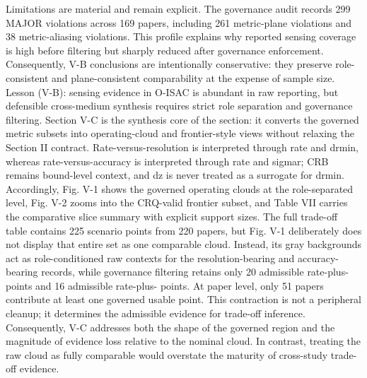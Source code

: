 {}Limitations are material and remain explicit. The governance audit records 299 MAJOR violations across 169 papers, including 261 metric-plane violations and 38 metric-aliasing violations. This profile explains why reported sensing coverage is high before filtering but sharply reduced after governance enforcement. Consequently, V-B conclusions are intentionally conservative: they preserve role-consistent and plane-consistent comparability at the expense of sample size.\markdownRendererParagraphSeparator
{}Lesson (V-B): sensing evidence in O-ISAC is abundant in raw reporting, but defensible cross-medium synthesis requires strict role separation and governance filtering.\markdownRendererInterblockSeparator
{}
\markdownRendererSectionEnd \markdownRendererSectionBegin
{}\markdownRendererInterblockSeparator
{}Section V-C is the synthesis core of the section: it converts the governed metric subsets into operating-cloud and frontier-style views without relaxing the Section II contract. Rate-versus-resolution is interpreted through rate and drmin, whereas rate-versus-accuracy is interpreted through rate and sigma\markdownRendererUnderscore{}r; CRB remains bound-level context, and dz is never treated as a surrogate for drmin. Accordingly, Fig. V-1 shows the governed operating clouds at the role-separated level, Fig. V-2 zooms into the CRQ-valid frontier subset, and Table VII carries the comparative slice summary with explicit support sizes.\markdownRendererParagraphSeparator
{}\markdownRendererParagraphSeparator
{}The full trade-off table contains 225 scenario points from 220 papers, but Fig. V-1 deliberately does not display that entire set as one comparable cloud. Instead, its gray backgrounds act as role-conditioned raw contexts for the resolution-bearing and accuracy-bearing records, while governance filtering retains only 20 admissible rate-plus- points and 16 admissible rate-plus- points. At paper level, only 51 papers contribute at least one governed usable point. This contraction is not a peripheral cleanup; it determines the admissible evidence for trade-off inference. Consequently, V-C addresses both the shape of the governed region and the magnitude of evidence loss relative to the nominal cloud. In contrast, treating the raw cloud as fully comparable would overstate the maturity of cross-study trade-off evidence.\markdownRendererParagraphSeparator
